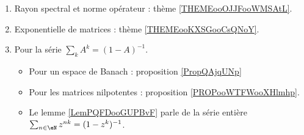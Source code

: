 

\begin{enumerate}
    \item
        Rayon spectral et norme opérateur : thème \ref{THEMEooOJJFooWMSAtL}.
    \item
        Exponentielle de matrices : thème \ref{THEMEooKXSGooCsQNoY}.
    \item
        Pour la série \( \sum_kA^k=(1-A)^{-1}\).
        \begin{itemize}
            \item Pour un espace de Banach : proposition \ref{PropQAjqUNp}
            \item Pour les matrices nilpotentes : proposition \ref{PROPooWTFWooXHlmhp}.
            \item Le lemme \ref{LemPQFDooGUPBvF} parle de la série entière \( \sum_{n\in \eN}z^{nk}=(1-z^k)^{-1}\).
        \end{itemize}
\end{enumerate}
